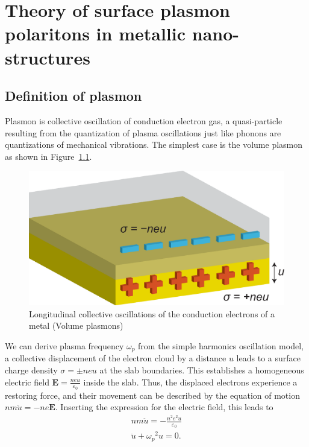 \chapter{Theory of surface plasmon polaritons in metallic nano-structures}
\label{c:thm}
\section{Definition of plasmon}

Plasmon is collective oscillation of conduction electron gas, a quasi-particle resulting from the quantization of plasma oscillations just like phonons are quantizations of mechanical vibrations. The simplest case is the volume plasmon as shown in Figure~\ref{fig:bulk}.
\begin{figure}[htb]
\centering
\includegraphics[scale=0.5]{figures/bulk.eps}
\caption{\label{fig:bulk}Longitudinal collective oscillations of the conduction electrons of a metal (Volume plasmons)}
\end{figure}
 We can derive plasma frequency $\omega_p$ from the simple harmonics oscillation model, a collective displacement of the electron cloud by a distance $u$ leads to a surface charge density $\sigma = \pm neu$ at the slab boundaries. This establishes a homogeneous electric field $\mathbf{E} = \frac{neu}{\varepsilon_0}$ inside the slab. Thus, the displaced electrons experience a restoring force, and their movement can be described by the equation of motion $nm\ddot{u} = -ne\mathbf{E}$. Inserting the expression for the electric field, this leads to
 \begin{subequations}
 \begin{align}
 nm\ddot{u} = -\frac{n^2e^2u}{\varepsilon_0} \\
 \ddot{u} + {\omega_p}^{2}u = 0\text{.}
 \end{align}
 \end{subequations}
